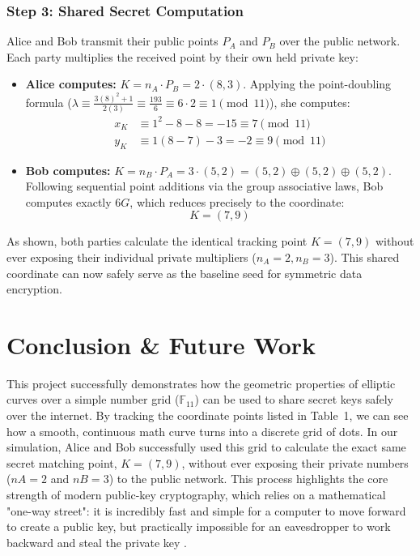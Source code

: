 \documentclass[11pt,a4paper]{article}
\begin{document}
\subsubsection{Step 3: Shared Secret Computation}
Alice and Bob transmit their public points $P_A$ and $P_B$ over the public network. Each party multiplies the received point by their own held private key:
\begin{itemize}
    \item \textbf{Alice computes:} $K = n_A \cdot P_B = 2 \cdot (8, 3)$. Applying the point-doubling formula ($\lambda \equiv \frac{3(8)^2+1}{2(3)} \equiv \frac{193}{6} \equiv 6 \cdot 2 \equiv 1 \pmod{11}$), she computes:
    \begin{align}
        x_K &\equiv 1^2 - 8 - 8 = -15 \equiv 7 \pmod{11} \\
        y_K &\equiv 1(8 - 7) - 3 = -2 \equiv 9 \pmod{11}
    \end{align}
    \item \textbf{Bob computes:} $K = n_B \cdot P_A = 3 \cdot (5, 2) = (5,2) \oplus (5,2) \oplus (5,2)$. Following sequential point additions via the group associative laws, Bob computes exactly $6G$, which reduces precisely to the coordinate:
    \begin{equation}
        K = (7, 9)
    \end{equation}
\end{itemize}
As shown, both parties calculate the identical tracking point $K = (7, 9)$ without ever exposing their individual private multipliers ($n_A=2, n_B=3$). This shared coordinate can now safely serve as the baseline seed for symmetric data encryption.

\section{Conclusion \& Future Work}
\label{sec:conclusion}

This project successfully demonstrates how the geometric properties of elliptic curves over a simple number grid ($\mathbb{F}_{11}$) can be used to share secret keys safely over the internet. By tracking the coordinate points listed in Table~1, we can see how a smooth, continuous math curve turns into a discrete grid of dots. In our simulation, Alice and Bob successfully used this grid to calculate the exact same secret matching point, $K = (7, 9)$, without ever exposing their private numbers ($nA = 2$ and $nB = 3$) to the public network. This process highlights the core strength of modern public-key cryptography, which relies on a mathematical "one-way street": it is incredibly fast and simple for a computer to move forward to create a public key, but practically impossible for an eavesdropper to work backward and steal the private key \cite{hoffstein}.
\end{document}
